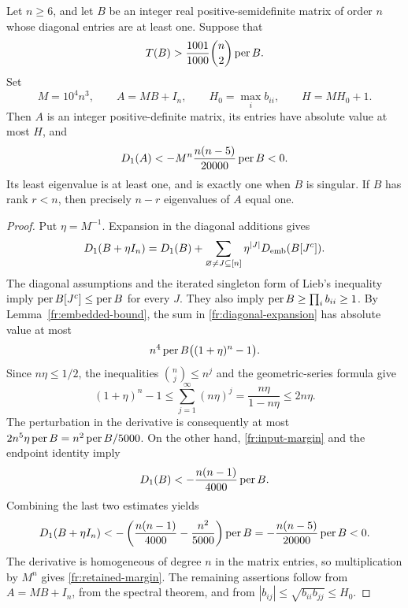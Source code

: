 \begin{theorem}
\label{fr:integer-regularization}
Let \(n\ge6\), and let \(B\) be an integer real positive-semidefinite
matrix of order \(n\) whose diagonal entries are at least one. Suppose
that
\begin{equation}\label{fr:input-margin}
 T(B)>\frac{1001}{1000}\binom n2\operatorname{per} B.
\end{equation}
Set
\begin{equation}\label{fr:explicit-matrix}
 M=10^4n^3,\qquad A=MB+I_n,\qquad
 H_0=\max_i b_{ii},\qquad H=MH_0+1.
\end{equation}
Then \(A\) is an integer positive-definite matrix, its entries have
absolute value at most \(H\), and
\begin{equation}\label{fr:retained-margin}
 D_1(A)<-M^n\frac{n(n-5)}{20000}\operatorname{per} B<0.
\end{equation}
Its least eigenvalue is at least one, and is exactly one when \(B\)
is singular. If \(B\) has rank \(r<n\), then precisely \(n-r\)
eigenvalues of \(A\) equal one.
\end{theorem}

\begin{proof}
Put \(\eta=M^{-1}\). Expansion in the diagonal additions gives
\begin{equation}\label{fr:diagonal-expansion}
 D_1(B+\eta I_n)
 =D_1(B)+\sum_{\varnothing\ne J\subseteq[n]}
       \eta^{|J|}D_{\rm emb}(B[J^c]).
\end{equation}
The diagonal assumptions and the iterated singleton form of Lieb's
inequality imply
\(\operatorname{per} B[J^c]\le\operatorname{per} B\) for every \(J\). They also imply
\(\operatorname{per} B\ge\prod_i b_{ii}\ge1\). By
Lemma~\ref{fr:embedded-bound}, the sum in
\eqref{fr:diagonal-expansion} has absolute value at most
\[
 n^4\operatorname{per} B\bigl((1+\eta)^n-1\bigr).
\]
Since \(n\eta\le1/2\), the inequalities
\(\binom nj\le n^j\) and the geometric-series formula give
\[
 (1+\eta)^n-1
 \le\sum_{j=1}^\infty(n\eta)^j
 =\frac{n\eta}{1-n\eta}\le2n\eta.
\]
The perturbation in the derivative is consequently at most
\(2n^5\eta\operatorname{per} B=n^2\operatorname{per} B/5000\). On the other hand,
\eqref{fr:input-margin} and the endpoint identity imply
\[
 D_1(B)<-\frac{n(n-1)}{4000}\operatorname{per} B.
\]
Combining the last two estimates yields
\[
 D_1(B+\eta I_n)
 <-\left(\frac{n(n-1)}{4000}-\frac{n^2}{5000}\right)\operatorname{per} B
 =-\frac{n(n-5)}{20000}\operatorname{per} B<0.
\]
The derivative is homogeneous of degree \(n\) in the matrix entries,
so multiplication by \(M^n\) gives \eqref{fr:retained-margin}.
The remaining assertions follow from \(A=MB+I_n\), from the spectral
theorem, and from
\(|b_{ij}|\le\sqrt{b_{ii}b_{jj}}\le H_0\).
\end{proof}

